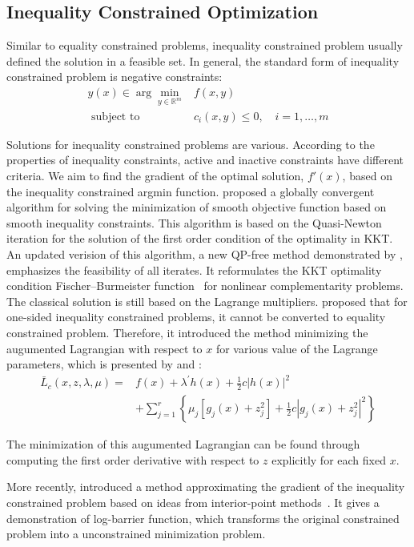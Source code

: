 \subsection{Inequality Constrained Optimization}
\label{sec:ineq-opt}
Similar to equality constrained problems, inequality constrained problem usually defined the solution in a feasible set. In general, the standard form of inequality constrained problem is negative constraints:
$$
\begin{array}{rl}y(x) \in \arg \min _{y \in \mathbb{R}^{m}} & f(x, y) \\ \textrm { subject to } & c_i(x, y) \leq 0, \quad i = 1, \dots, m \end{array}
$$
\par Solutions for inequality constrained problems are various. According to the properties of inequality constraints, active and inactive constraints have different criteria. We aim to find the gradient of the optimal solution, $f\prime (x)$, based on the inequality constrained argmin function. 
 \cite{PE:88} proposed a globally convergent algorithm for solving the minimization of smooth objective function based on smooth inequality constraints. This algorithm is based on the Quasi-Newton~\citep{DJ:77} iteration for the solution of the first order condition of the optimality in KKT. An updated verision of this algorithm, a new QP-free method demonstrated by \cite{QH:00}, emphasizes the feasibility of all iterates. It reformulates the KKT optimality condition Fischer–Burmeister function~\citep{JH:99} for nonlinear complementarity problems. The classical solution is still based on the Lagrange multipliers. \cite{BD:14} proposed that for one-sided inequality constrained problems, it cannot be converted to equality constrained problem. Therefore, it introduced the method minimizing the augumented Lagrangian with respect to $x$ for various value of the Lagrange parameters, which is presented by \cite{PM:69} and \cite{HM:69}: 
 $$
 \begin{aligned} \bar{L}_{c}(x, z, \lambda, \mu)=& f(x)+\lambda^{\prime} h(x)+\frac{1}{2} c|h(x)|^{2} \\ &+\sum_{j=1}^{r}\left\{\mu_{j}\left[g_{j}(x)+z_{j}^{2}\right]+\frac{1}{2} c\left|g_{j}(x)+z_{j}^{2}\right|^{2}\right\} \end{aligned}
 $$
 \par The minimization of this augumented Lagrangian can be found through computing the first order derivative with respect to $z$ explicitly for each fixed $x$. 
\par More recently, \cite{SG:16} introduced a method approximating the gradient of the inequality constrained problem based on ideas from interior-point methods~\citep{BS:04}. It gives a demonstration of log-barrier function, which transforms the original constrained problem into a unconstrained minimization problem.
